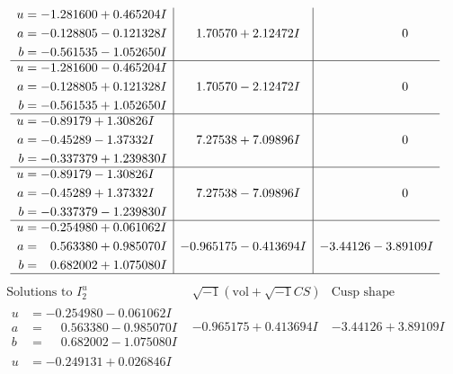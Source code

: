 \documentclass[1p]{elsarticle_modified}
\theoremstyle{definition}
\newcommand{\I}{\sqrt{-1}}
\begin{document}
$$\begin{array}{c|c|c}
\begin{aligned}
u &= -1.281600 + 0.465204 I \\
a &= -0.128805 - 0.121328 I \\
b &= -0.561535 - 1.052650 I\end{aligned}
 & \phantom{-}1.70570 + 2.12472 I & \phantom{-0.000000 } 0 \\ \hline\begin{aligned}
u &= -1.281600 - 0.465204 I \\
a &= -0.128805 + 0.121328 I \\
b &= -0.561535 + 1.052650 I\end{aligned}
 & \phantom{-}1.70570 - 2.12472 I & \phantom{-0.000000 } 0 \\ \hline\begin{aligned}
u &= -0.89179 + 1.30826 I \\
a &= -0.45289 - 1.37332 I \\
b &= -0.337379 + 1.239830 I\end{aligned}
 & \phantom{-}7.27538 + 7.09896 I & \phantom{-0.000000 } 0 \\ \hline\begin{aligned}
u &= -0.89179 - 1.30826 I \\
a &= -0.45289 + 1.37332 I \\
b &= -0.337379 - 1.239830 I\end{aligned}
 & \phantom{-}7.27538 - 7.09896 I & \phantom{-0.000000 } 0 \\ \hline\begin{aligned}
u &= -0.254980 + 0.061062 I \\
a &= \phantom{-}0.563380 + 0.985070 I \\
b &= \phantom{-}0.682002 + 1.075080 I\end{aligned}
 & -0.965175 - 0.413694 I & -3.44126 - 3.89109 I\\
 \hline 
 \end{array}$$\newpage$$\begin{array}{c|c|c}  
\text{Solutions to }I^u_{2}& \I (\text{vol} + \sqrt{-1}CS) & \text{Cusp shape}\\
 \hline 
\begin{aligned}
u &= -0.254980 - 0.061062 I \\
a &= \phantom{-}0.563380 - 0.985070 I \\
b &= \phantom{-}0.682002 - 1.075080 I\end{aligned}
 & -0.965175 + 0.413694 I & -3.44126 + 3.89109 I \\ \hline\begin{aligned}
u &= -0.249131 + 0.026846 I \\

\end{aligned}
\end{array}$$
\end{document}

